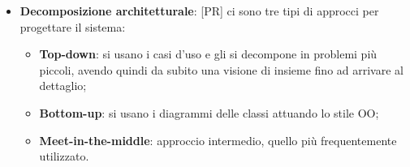 \begin{itemize}

	\item \textbf{Decomposizione architetturale}: [PR] ci sono tre tipi di approcci per progettare il sistema:
		\begin{itemize}
			\item \textbf{Top-down}: si usano i casi d'uso e gli si decompone in problemi più piccoli, avendo quindi da subito una visione di insieme fino ad arrivare al dettaglio;
			\item \textbf{Bottom-up}: si usano i diagrammi delle classi attuando lo stile OO;
			\item \textbf{Meet-in-the-middle}: approccio intermedio, quello più frequentemente utilizzato.
		\end{itemize}


\end{itemize}
